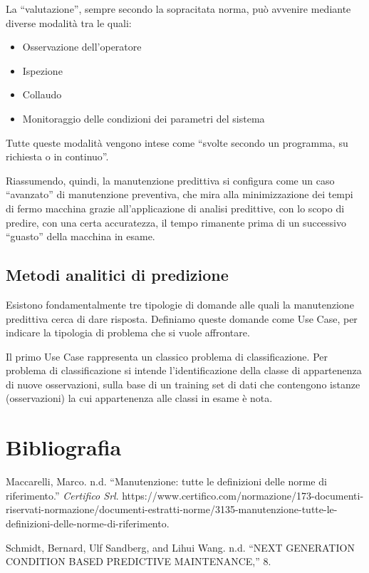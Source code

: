 \documentclass[10pt,]{article}
\providecommand{\tightlist}{%
  \setlength{\itemsep}{0pt}\setlength{\parskip}{0pt}}
\begin{document}
La ``valutazione'', sempre secondo la sopracitata norma, può avvenire
mediante diverse modalità tra le quali:

\begin{itemize}
\tightlist
\item
  Osservazione dell'operatore
\item
  Ispezione
\item
  Collaudo
\item
  Monitoraggio delle condizioni dei parametri del sistema
\end{itemize}

Tutte queste modalità vengono intese come ``svolte secondo un programma,
su richiesta o in continuo''.

Riassumendo, quindi, la manutenzione predittiva si configura come un
caso ``avanzato'' di manutenzione preventiva, che mira alla
minimizzazione dei tempi di fermo macchina grazie all'applicazione di
analisi predittive, con lo scopo di predire, con una certa accuratezza,
il tempo rimanente prima di un successivo ``guasto'' della macchina in
esame.

\subsection{Metodi analitici di
predizione}\label{metodi-analitici-di-predizione}

Esistono fondamentalmente tre tipologie di domande alle quali la
manutenzione predittiva cerca di dare risposta. Definiamo queste domande
come Use Case, per indicare la tipologia di problema che si vuole
affrontare.

Il primo Use Case rappresenta un classico problema di classificazione.
Per problema di classificazione si intende l'identificazione della
classe di appartenenza di nuove osservazioni, sulla base di un training
set di dati che contengono istanze (osservazioni) la cui appartenenza
alle classi in esame è nota. \pagebreak

\section*{Bibliografia}\label{bibliografia}

\hypertarget{refs}{}
\hypertarget{ref-maccarelliManutenzioneTutteDefinizioni}{}
Maccarelli, Marco. n.d. ``Manutenzione: tutte le definizioni delle norme
di riferimento.'' \emph{Certifico Srl}.
https://www.certifico.com/normazione/173-documenti-riservati-normazione/documenti-estratti-norme/3135-manutenzione-tutte-le-definizioni-delle-norme-di-riferimento.

\hypertarget{ref-schmidtNEXTGENERATIONCONDITION}{}
Schmidt, Bernard, Ulf Sandberg, and Lihui Wang. n.d. ``NEXT GENERATION
CONDITION BASED PREDICTIVE MAINTENANCE,'' 8.
\end{document}
